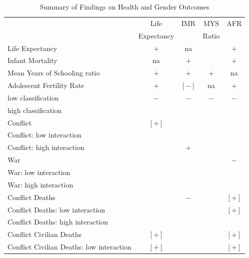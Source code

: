 \documentclass[12pt]{article}
\begin{document}
\begin{table}[!htbp]
\footnotesize
\centering
\caption{Summary of Findings on Health and Gender Outcomes}
\label{table_panel_gh}
\begin{tabular}{lc|c|c|c}
\toprule
                                           & Life       & IMR     & MYS     & AFR \\
                                           & Expectancy &         & Ratio   & \\
\midrule
Life Expectancy                                   & $+$   & na      &         & $+$ \\
Infant Mortality                                  & na    & $+$     &         & $+$ \\
Mean Years of Schooling ratio                     & $+$   & $+$     & $+$     & na \\
Adolescent Fertility Rate                         & $+$   & $[-]$   & na      & $+$ \\
low classification                                & $-$   & $-$     & $-$     & $-$ \\
high classification                               &       &         &         & \\
Conflict                                          & $[+]$ &         &         & \\
\qquad Conflict: low interaction                  &       &         &         & \\
\qquad Conflict: high interaction                 &       & $+$     &         & \\
War                                               &       &         &         & $-$ \\
\qquad War: low interaction                       &       &         &         & \\
\qquad War: high interaction                      &       &         &         & \\
Conflict Deaths                                   &       & $-$     &         & $[+]$ \\
\qquad Conflict Deaths: low interaction           &       &         &         & $[+]$ \\
\qquad Conflict Deaths: high interaction          &       &         &         & \\
Conflict Civilian Deaths                          & $[+]$ &         &         & $[+]$ \\
\qquad Conflict Civilian Deaths: low interaction  & $[+]$ &         &         & $[+]$ \\

\end{tabular}
\end{table}
\end{document}
